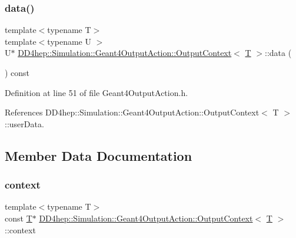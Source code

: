 \subsubsection{\texorpdfstring{data()}{data()}}
{\footnotesize\ttfamily template$<$typename T$>$ \\
template$<$typename U $>$ \\
U$\ast$ \hyperlink{class_d_d4hep_1_1_simulation_1_1_geant4_output_action_1_1_output_context}{D\+D4hep\+::\+Simulation\+::\+Geant4\+Output\+Action\+::\+Output\+Context}$<$ \hyperlink{class_t}{T} $>$\+::data (\begin{DoxyParamCaption}{ }\end{DoxyParamCaption}) const\hspace{0.3cm}{\ttfamily [inline]}}



Definition at line 51 of file Geant4\+Output\+Action.\+h.



References D\+D4hep\+::\+Simulation\+::\+Geant4\+Output\+Action\+::\+Output\+Context$<$ T $>$\+::user\+Data.



\subsection{Member Data Documentation}
\hypertarget{class_d_d4hep_1_1_simulation_1_1_geant4_output_action_1_1_output_context_aba6a758066ac2a69e7300ac168bf89b5}{}\label{class_d_d4hep_1_1_simulation_1_1_geant4_output_action_1_1_output_context_aba6a758066ac2a69e7300ac168bf89b5} 
\subsubsection{\texorpdfstring{context}{context}}
{\footnotesize\ttfamily template$<$typename T$>$ \\
const \hyperlink{class_t}{T}$\ast$ \hyperlink{class_d_d4hep_1_1_simulation_1_1_geant4_output_action_1_1_output_context}{D\+D4hep\+::\+Simulation\+::\+Geant4\+Output\+Action\+::\+Output\+Context}$<$ \hyperlink{class_t}{T} $>$\+::context}



